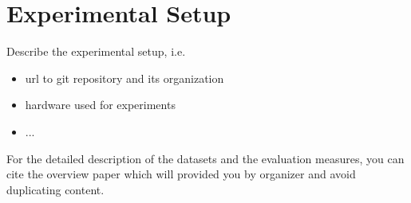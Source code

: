 \section{Experimental Setup}
\label{sec:setup}

Describe the experimental setup, i.e.
\begin{itemize}
	\item url to git repository and its organization
	\item hardware used for experiments
	\item ...
\end{itemize}


For the detailed description of the datasets and the evaluation measures, you can cite the overview paper which will provided you by organizer and avoid duplicating content.